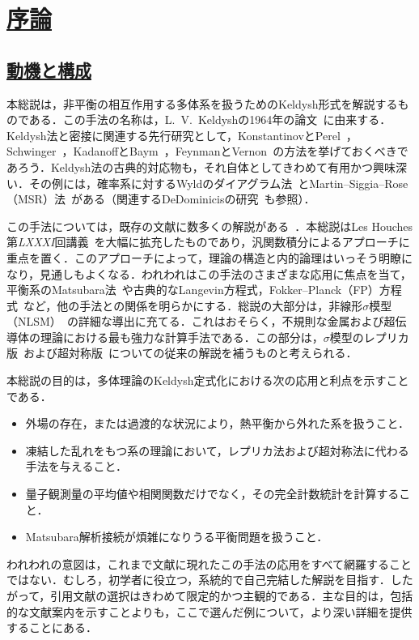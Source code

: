\documentclass[a4paper,11pt]{ltjsarticle}
\newcommand{\sectionlink}[1]{\section[#1]{\hyperlink{toc}{#1}}}
\newcommand{\subsectionlink}[1]{\subsection[#1]{\hyperlink{toc}{#1}}}
\begin{document}
\hypertarget{toc}{}
\tableofcontents
\clearpage
\sectionlink{序論}\label{sec_intro}
\subsectionlink{動機と構成}\label{sec_motivation}


本総説は，非平衡の相互作用する多体系を扱うためのKeldysh形式を解説するものである．この手法の名称は，L.~V.~Keldyshの1964年の論文~\cite{Keldysh-1964}に由来する．Keldysh法と密接に関連する先行研究として，KonstantinovとPerel~\cite{KonstantinovPerel}，Schwinger~\cite{Schwinger}，KadanoffとBaym~\cite{KadanoffBaym}，FeynmanとVernon~\cite{Feynman}の方法を挙げておくべきであろう．Keldysh法の古典的対応物も，それ自体としてきわめて有用かつ興味深い．その例には，確率系に対するWyldのダイアグラム法~\cite{Wyld}とMartin--Siggia--Rose（MSR）法~\cite{MSR}がある（関連するDeDominicisの研究~\cite{DeDominicis}も参照）．


この手法については，既存の文献に数多くの解説がある~\cite{Lifshitz,RammerSmith,SmithJensen-book,Mahan,Rammer-book,SchwabRaimondi,Spicka}．本総説はLes Houches第\textit{LXXXI}回講義~\cite{Kamenev}を大幅に拡充したものであり，汎関数積分によるアプローチに重点を置く．このアプローチによって，理論の構造と内的論理はいっそう明瞭になり，見通しもよくなる．われわれはこの手法のさまざまな応用に焦点を当て，平衡系のMatsubara法~\cite{Matsubara,AGD}や古典的なLangevin方程式，Fokker--Planck（FP）方程式~\cite{Gardiner,Risken}など，他の手法との関係を明らかにする．総説の大部分は，非線形$\sigma$模型（NLSM）~\cite{HorbachSchon,KamenevAndreev,ChamonLudwigNayak,
Feigel'manLarkinSkvortsov}の詳細な導出に充てる．これはおそらく，不規則な金属および超伝導体の理論における最も強力な計算手法である．この部分は，$\sigma$模型のレプリカ版~\cite{Wegner,EfetovLarkinKhmelnitskii,Finkel'stein,BelitzKirkpatrick,Lerner}および超対称版~\cite{Efetov,Efetov-book,Mirlin}についての従来の解説を補うものと考えられる．


本総説の目的は，多体理論のKeldysh定式化における次の応用と利点を示すことである．
\begin{itemize}
\item 外場の存在，または過渡的な状況により，熱平衡から外れた系を扱うこと．


\item 凍結した乱れをもつ系の理論において，レプリカ法および超対称法に代わる手法を与えること．


\item 量子観測量の平均値や相関関数だけでなく，その完全計数統計を計算すること．


\item Matsubara解析接続が煩雑になりうる平衡問題を扱うこと．
\end{itemize}
われわれの意図は，これまで文献に現れたこの手法の応用をすべて網羅することではない．むしろ，初学者に役立つ，系統的で自己完結した解説を目指す．したがって，引用文献の選択はきわめて限定的かつ主観的である．主な目的は，包括的な文献案内を示すことよりも，ここで選んだ例について，より深い詳細を提供することにある．
\end{document}
